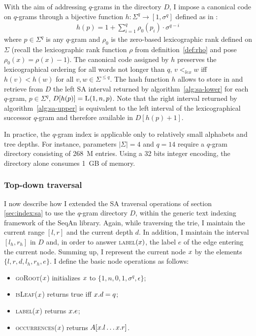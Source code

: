 With the aim of addressing $q$-grams in the directory $D$, I impose a canonical code on $q$-grams through a bijective function $h : \Sigma^q \rightarrow [1, \sigma^q]$ defined as in \citep{Knuth1973}:
\begin{eqnarray}
h(p) = 1 + \sum_{i=1}^{q}{\rho_0(p_i) \cdot \sigma^{q-i}}
\end{eqnarray}
where $p \in \Sigma^q$ is any $q$-gram and $\rho_0$ is the zero-based lexicographic rank defined on $\Sigma$ (recall the lexicographic rank function $\rho$ from definition~\ref{def:rho} and pose $\rho_0(x) = \rho(x) - 1$).
The canonical code assigned by $h$ preserves the lexicographical ordering for all words not longer than $q$, \ie $v <_{lex} w$ iff $h(v) < h(w)$ for all $v,w \in \Sigma^{\leq q}$.
The hash function $h$ allows to store in and retrieve from $D$ the left SA interval returned by algorithm~\ref{alg:sa-lower} for each $q$-gram, \ie $p \in \Sigma^q$, $D[h(p)] = \textsc{L}(1,n,p)$.
Note that the right interval returned by algorithm~\ref{alg:sa-upper} is equivalent to the left interval of the lexicographical successor $q$-gram and therefore available in $D[h(p)+1]$.

In practice, the $q$-gram index is applicable only to relatively small alphabets and tree depths.
For instance, parameters $|\Sigma| = 4$ and $q=14$ require a $q$-gram directory consisting of 268~M entries.
Using a 32 bits integer encoding, the directory alone consumes 1~GB of memory.

\subsubsection{Top-down traversal}

I now describe how I extended the SA traversal operations of section \ref{sec:index:sa} to use the $q$-gram directory $D$, within the generic text indexing framework of the SeqAn library.
Again, while traversing the trie, I maintain the current range $[l,r]$ and the current depth $d$.
In addition, I maintain the interval $[l_h,r_h]$ in $D$ and, in order to answer \textsc{label}$(x)$, the label $e$ of the edge entering the current node.
Summing up, I represent the current node $x$ by the elements $\{ l, r, d, l_h, r_h, e \}$.
I define the basic node operations as follows:
\begin{itemize}
\item \textsc{goRoot}($x$) initializes $x$ to $\{ 1, n, 0, 1, \sigma^q, \epsilon \}$;
\item \textsc{isLeaf}($x$) returns true iff $x.d=q$;
\item \textsc{label}($x$) returns $x.e$;
\item \textsc{occurrences}($x$) returns $A[x.l \dots x.r]$.
\end{itemize}

